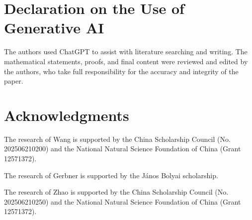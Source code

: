 \documentclass[12pt]{article}
\begin{document}
\section*{Declaration on the Use of Generative AI}

The authors used ChatGPT to assist with literature searching and writing.
The mathematical statements, proofs, and final content were reviewed and
edited by the authors, who take full responsibility for the accuracy and
integrity of the paper.




\bigskip
\section*{Acknowledgments} 
The research of Wang is supported by the China Scholarship Council (No. 202506210200) and
the National Natural Science Foundation of China (Grant 12571372). 

The research of Gerbner is supported by the J\'anos Bolyai scholarship.

The research of Zhao is supported by the China Scholarship Council (No. 202506210250) and
the National Natural Science Foundation of China (Grant 12571372).



\end{document}
